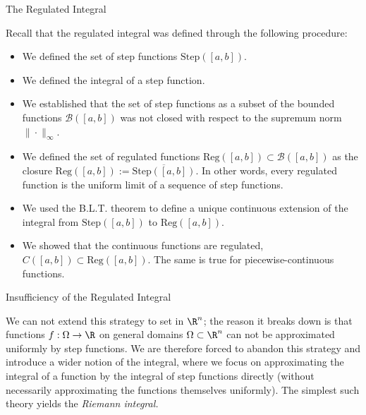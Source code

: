 \documentclass[smaller,hyperref={CJKbookmarks=true}]{beamer}
\begin{document}
\begin{frame}[t]{The Regulated Integral}
\begin{spacing}{1.1}
Recall that the regulated integral was defined through the following
procedure:
\begin{itemize}
  \item We defined the set of step functions $\text{Step}([a,b])$.
  \item We defined the integral of a step function.
  \item We established that the set of step functions as a subset of the
bounded functions $\mathcal{B}([a,b])$ was not closed with respect to the supremum norm $\|\cdot\|_\infty$.
  \item We defined the set of regulated functions $\text{Reg}([a,b])\subset\mathcal{B}
      ([a,b])$ as the closure $\text{Reg}([a,b]):=\overline{\text{Step}([a,b])}$. In other words, every regulated
function is the uniform limit of a sequence of step functions.
  \item We used the B.L.T. theorem to define a unique continuous extension
of the integral from $\text{Step}([a,b])$ to $\text{Reg}([a,b])$.
  \item We showed that the continuous functions are regulated, $C([a,b])\subset\text{Reg}([a,b])$. The same is true for piecewise-continuous
functions.
\end{itemize}
\end{spacing}
\end{frame}
\begin{frame}[c]{Insuf{}ficiency of the Regulated Integral}
\begin{spacing}{1.1}
We can not extend this strategy to set in $\R^n$; the reason it breaks down is that functions $f:\Omega\to\R$ on general domains $\Omega\subset\R^n$ \textcolor[rgb]{1.00,0.00,0.00}{can not be approximated uniformly} by step functions. We are therefore forced to
abandon this strategy and introduce a wider notion of the integral, where
we focus on approximating the integral of a function by the integral of
step functions directly (without necessarily approximating the functions
themselves uniformly). The simplest such theory yields the \emph{Riemann
integral.}
\end{spacing}
\end{frame}
\end{document}
